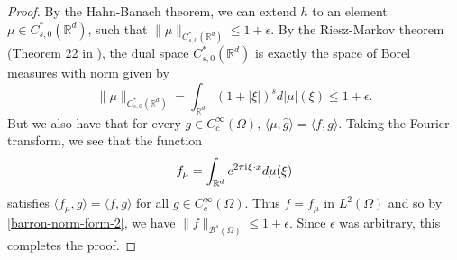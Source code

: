 \begin{proof}
 By the Hahn-Banach theorem, we can extend $h$ to an element $\mu\in C^*_{s,0}(\mathbb{R}^d)$, such that $\|\mu\|_{C^*_{s,0}(\mathbb{R}^d)}\leq 1 + \epsilon$. By the Riesz-Markov theorem (Theorem 22 in \cite{markoff1938mean}), the dual space $C^*_{s,0}(\mathbb{R}^d)$ is exactly the space of Borel measures with norm given by
 \begin{equation}
  \|\mu\|_{C^*_{s,0}(\mathbb{R}^d)} = \int_{\mathbb{R}^d} (1+|\xi|)^s d|\mu|(\xi) \leq 1 + \epsilon.
 \end{equation}
 But we also have that for every $g\in C^\infty_c(\Omega)$, $\langle \mu, \hat{g}\rangle = \langle f,g\rangle$. Taking the Fourier transform, we see that the function
 \begin{equation}
  f_\mu = \int_{\mathbb{R}^d}e^{2\pi {\mathrm{i}\mkern1mu}  \xi\cdot x}d\mu(\xi)
 \end{equation}
 satisfies $\langle f_\mu, g\rangle = \langle f,g\rangle$ for all $g\in C^\infty_c(\Omega)$. Thus $f = f_\mu$ in $L^2(\Omega)$ and so by \eqref{barron-norm-form-2}, we have $\|f\|_{\mathcal{B}^{s}(\Omega)} \leq 1 + \epsilon$. Since $\epsilon$ was arbitrary, this completes the proof.

\end{proof}

